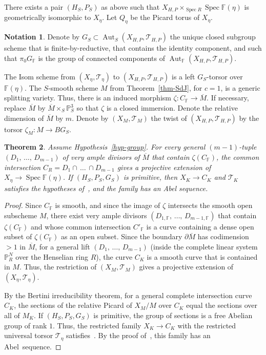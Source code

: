 \documentclass[11pt]{article}
\newtheorem{theo}{Theorem}[section]
\theoremstyle{definition}
\newtheorem{nota}[theo]{Notation}
\numberwithin{equation}{section}
\numberwithin{figure}{section}
\numberwithin{table}{section}
\newcommand{\mbb}{\mathbb}
\newcommand{\PP}{\mbb{P}}
\newcommand{\FF}{\mbb{F}}
\newcommand{\mc}{\mathcal}
\newcommand{\mcT}{\mc{T}}
\newcommand{\ol}{\overline}
\newcommand{\Xx}{X}
\newcommand{\Cc}{C}
\newcommand{\Rr}{R}
\newcommand{\FR}{K}
\DeclareMathOperator{\SP}{Spec}
\DeclareMathOperator{\Aut}{Aut}
\begin{document}
There exists a pair $(H_S,P_S)$ as above such that $X_{H,P}\times_{\SP R} \SP \FF(\eta)$ is geometrically isomorphic to $X_\eta$. Let $Q_\eta$ be the Picard torus of $X_\eta$.

\begin{nota}\label{notat-group}
Denote by $G_S\subset
\Aut_S(X_{H,P},\mcT_{H,P})$ the unique closed subgroup scheme that is finite-by-reductive, that contains the identity component, and such that $\pi_0 G_{\FF}$ is the group of connected components of $\Aut_{\FF}(X_{H,P},\mcT_{H,P})$.
\end{nota}

The Isom scheme from $(X_\eta,\mcT_\eta)$ to $(X_{H,P},\mcT_{H,P})$ is a left $G_S$-torsor over $\FF(\eta)$. The $S$-smooth scheme $M$ from Theorem~\ref{thm-SdJ}, for $c=1$, is a generic splitting variety. Thus, there is an induced morphism $\zeta:\Cc_{\FF}\to \ol{M}$. If necessary, replace $\ol{M}$ by $\ol{M}\times_S \PP^3_S$ so that $\zeta$ is a closed immersion. Denote the relative dimension of $\ol{M}$ by $m$. Denote by $(\Xx_M,\mcT_M)$ the twist of $(X_{H,P},\mcT_{H,P})$ by the torsor $\zeta_M:M\to BG_S$.

\begin{theo}
\cite{Zhu} \label{thm-group}
Assume Hypothesis~\ref{hyp-group}. For every general $(m-1)$-tuple $(D_1,\,\dots,\,D_{m-1})$ of very ample divisors of $\ol{M}$ that contain $\zeta(\Cc_{\FF})$, the common intersection $\Cc_R = D_1\cap\,\dots\,\cap D_{m-1}$ gives a projective extension of $X_\eta \to \SP \FF(\eta)$. If $(H_S,P_S,G_S)$ is primitive, then $\Xx_\FR \to \Cc_\FR$ and $\mcT_\FR$ satisfies the hypotheses of~\cite[5.1]{Zhu}, and the family has an Abel sequence.
\end{theo}

\begin{proof}
Since $\Cc_{\FF}$ is smooth, and since the image of $\zeta$ intersects the smooth open subscheme $M$, there exist very ample divisors $(D_{1,\FF},\,\dots,\,D_{m-1,\FF})$ that contain $\zeta(\Cc_{\FF})$ and whose common intersection $\Cc'_{\FF}$ is a curve containing a dense open subset of $\zeta(\Cc_{\FF})$ as an open subset. Since the boundary $\partial\ol{M}$ has codimension $>1$ in $\ol{M}$, for a general lift $(D_1,\,\dots,\,D_{m-1})$ (inside the complete linear system $\PP^N_\Rr$ over the Henselian ring $\Rr$), the curve $\Cc_\FR$ is a smooth curve that is contained in $M$. Thus, the restriction of $(\Xx_M,\mcT_M)$ gives a projective extension of $(\Xx_\eta,\mcT_\eta)$.

By the Bertini irreducibility theorem, for a general complete intersection curve $\Cc_\FR$, the sections of the relative Picard of $\Xx_M/M$ over $\Cc_\FR$ equal the sections over all of $M_\FR$. If $(H_S,P_S,G_S)$ is primitive, the group of sections is a free Abelian group of rank $1$. Thus, the restricted family $\Xx_\FR\to \Cc_\FR$ with the restricted universal torsor $\mcT_\eta$ satisfies~\cite[5.1]{Zhu}. By the proof of~\cite[Theorem~1.4]{Zhu}, this family has an Abel~sequence.
\end{proof}
\end{document}
